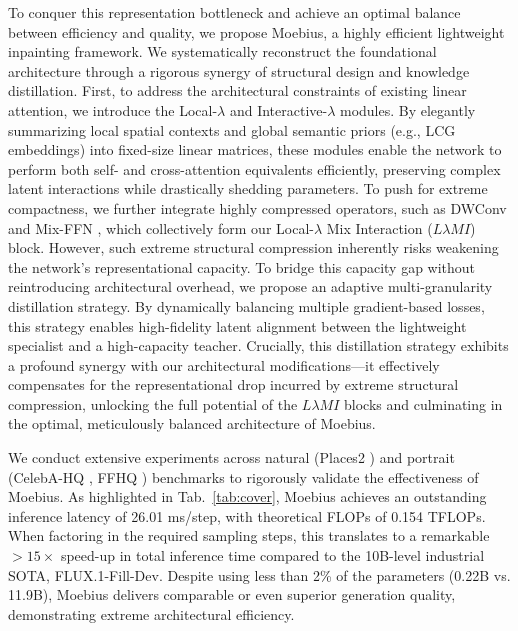 \documentclass[runningheads]{llncs}
\begin{document}
\vspace{-0.5em}
To conquer this representation bottleneck and achieve an optimal balance between efficiency and quality, we propose Moebius, a highly efficient lightweight inpainting framework. We systematically reconstruct the foundational architecture through a rigorous synergy of structural design and knowledge distillation. First, to address the architectural constraints of existing linear attention, we introduce the Local-$\lambda$ and Interactive-$\lambda$ modules. By elegantly summarizing local spatial contexts and global semantic priors (e.g., LCG embeddings) into fixed-size linear matrices, these modules enable the network to perform both self- and cross-attention equivalents efficiently, preserving complex latent interactions while drastically shedding parameters. To push for extreme compactness, we further integrate highly compressed operators, such as DWConv and Mix-FFN \cite{xie2024sana, xie2025sana}, which collectively form our Local-$\lambda$ Mix Interaction ($L\lambda MI$) block. However, such extreme structural compression inherently risks weakening the network's representational capacity. To bridge this capacity gap without reintroducing architectural overhead, we propose an adaptive multi-granularity distillation strategy. By dynamically balancing multiple gradient-based losses, this strategy enables high-fidelity latent alignment between the lightweight specialist and a high-capacity teacher. Crucially, this distillation strategy exhibits a profound synergy with our architectural modifications—it effectively compensates for the representational drop incurred by extreme structural compression, unlocking the full potential of the $L\lambda MI$ blocks and culminating in the optimal, meticulously balanced architecture of Moebius.




\vspace{-0.01em}
We conduct extensive experiments across natural (Places2 \cite{zhou2017places}) and portrait (CelebA-HQ \cite{karras2018celebahq}, FFHQ \cite{karras2018stylegan_ffhq}) benchmarks to rigorously validate the effectiveness of Moebius. As highlighted in Tab.~\ref{tab:cover}, Moebius achieves an outstanding inference latency of 26.01 ms/step, with theoretical FLOPs of 0.154 TFLOPs. When factoring in the required sampling steps, this translates to a remarkable $>15\times$ speed-up in total inference time compared to the 10B-level industrial SOTA, FLUX.1-Fill-Dev. Despite using less than 2\% of the parameters (0.22B vs. 11.9B), Moebius delivers comparable or even superior generation quality, demonstrating extreme architectural efficiency.
\end{document}

